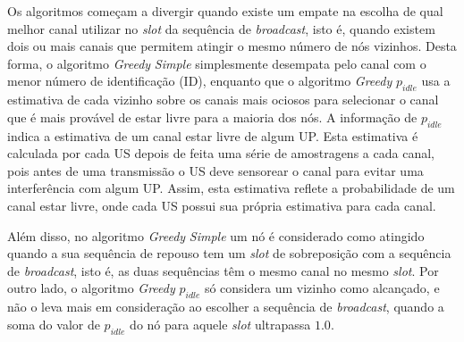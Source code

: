 Os algoritmos começam a divergir quando existe um empate na escolha de qual melhor canal utilizar no {\it slot} da sequência de {\it broadcast}, isto é, quando existem dois ou mais canais que permitem atingir o mesmo número de nós vizinhos. Desta forma, o algoritmo {\it Greedy} {\it Simple} simplesmente desempata pelo canal com o menor número de identificação (ID), enquanto que o algoritmo {\it Greedy} $p_{idle}$ usa a estimativa de cada vizinho sobre os canais mais ociosos para selecionar o canal que é mais provável de estar livre para a maioria dos nós. A informação de $p_{idle}$ indica a estimativa de um canal estar livre de algum UP. Esta estimativa é calculada por cada US depois de feita uma série de amostragens a cada canal, pois antes de uma transmissão o US deve sensorear o canal para evitar uma interferência com algum UP. Assim, esta estimativa reflete a probabilidade de um canal estar livre, onde cada US possui sua própria estimativa para cada canal.   


Além disso, no algoritmo {\it Greedy} {\it Simple} um nó é considerado como atingido quando a sua sequência de repouso tem um {\it slot} de sobreposição com a sequência de {\it broadcast}, isto é, as duas sequências têm o mesmo canal no mesmo {\it slot}. Por outro lado, o algoritmo {\it Greedy} $p_{idle}$ só considera um vizinho como alcançado, e não o leva mais em consideração ao escolher a sequência de {\it broadcast}, quando a soma do valor de $p_{idle}$ do nó para aquele {\it slot} ultrapassa $1.0$. %

